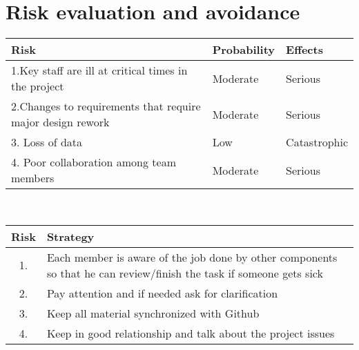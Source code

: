 \section {Risk evaluation and avoidance}

\begin{tabular}{  | l | l | l |}
    \hline
     Risk  & Probability  & Effects \\ \hline
    1.Key staff are ill at critical times in the project & Moderate & Serious  \\ \hline
    2.Changes to requirements that require major design rework & Moderate & Serious  \\ \hline
    3. Loss of data  & Low & Catastrophic \\ \hline
    4. Poor collaboration among team members & Moderate & Serious \\ \hline
\end{tabular}\\ 
\newline

\begin{tabular}{  | c |  p{14cm} |}
    \hline
    Risk  & Strategy \\ \hline
    1. & Each member is aware of the job done by other components so that he can review/finish the task if someone gets sick \\ \hline
    2. & Pay attention and if needed ask for clarification  \\ \hline
    3. & Keep all material synchronized with Github \\ \hline
    4. & Keep in good relationship and talk about the project issues \\ \hline
\end{tabular}